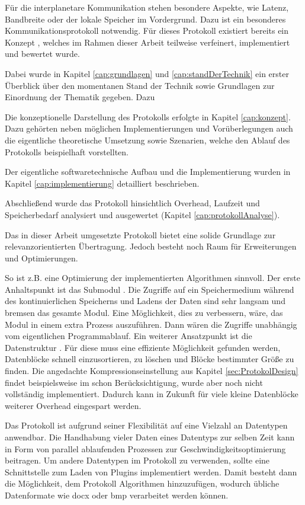
Für die interplanetare Kommunikation stehen besondere Aspekte, wie Latenz,
Bandbreite oder der lokale Speicher im Vordergrund. Dazu ist ein besonderes
Kommunikationsprotokoll notwendig. Für dieses Protokoll existiert
bereits ein Konzept \cite{Daher}, welches im Rahmen dieser Arbeit
teilweise verfeinert, implementiert und bewertet wurde.

Dabei wurde in Kapitel \ref{cap:grundlagen} und \ref{cap:standDerTechnik} ein
erster Überblick über den momentanen Stand der Technik sowie Grundlagen zur
Einordnung der Thematik gegeben. Dazu

Die konzeptionelle Darstellung des Protokolls erfolgte in Kapitel
\ref{cap:konzept}. Dazu gehörten neben möglichen Implementierungen und
Vorüberlegungen auch die eigentliche theoretische Umsetzung sowie Szenarien,
welche den Ablauf des Protokolls beispielhaft vorstellten. 

Der eigentliche softwaretechnische Aufbau und die Implementierung wurden in
Kapitel \ref{cap:implementierung} detailliert beschrieben.  

Abschließend wurde das
Protokoll hinsichtlich Overhead, Laufzeit und Speicherbedarf analysiert und
ausgewertet (Kapitel \ref{cap:protokollAnalyse}).

Das in dieser Arbeit umgesetzte Protokoll bietet eine solide
Grundlage zur relevanzorientierten Übertragung. Jedoch besteht noch Raum
für Erweiterungen und Optimierungen.

So ist z.B. eine Optimierung der implementierten Algorithmen sinnvoll.
Der erste Anhaltspunkt ist das Submodul .
Die Zugriffe auf ein Speichermedium während des kontinuierlichen Speicherns und
Ladens der Daten sind sehr langsam und bremsen das gesamte Modul. Eine Möglichkeit, dies zu
verbessern, wäre, das Modul in einem extra Prozess auszuf{\"u}hren. Dann wären
die Zugriffe unabhängig vom eigentlichen Programmablauf. Ein weiterer
Ansatzpunkt ist die Datenstruktur . Für diese muss
eine effiziente Möglichkeit gefunden werden, Datenblöcke schnell einzusortieren,
zu löschen und Bl{\"o}cke bestimmter Größe zu finden.
Die angedachte Kompressionseinstellung aus Kapitel \ref{sec:ProtokolDesign}
findet beispielsweise im  schon Berücksichtigung, wurde aber
noch nicht vollständig implementiert. Dadurch kann in Zukunft für viele kleine
Datenblöcke weiterer Overhead eingespart werden.

Das Protokoll ist aufgrund seiner Flexibilität auf eine Vielzahl an Datentypen
anwendbar. Die Handhabung vieler Daten eines Datentyps zur selben Zeit kann
in Form von parallel ablaufenden Prozessen zur Geschwindigkeitsoptimierung
beitragen. Um andere Datentypen im Protokoll zu verwenden, sollte eine
Schnittstelle zum Laden von Plugins implementiert werden. Damit besteht dann die
Möglichkeit, dem Protokoll Algorithmen hinzuzufügen, wodurch
übliche Datenformate wie docx oder bmp verarbeitet werden können.

